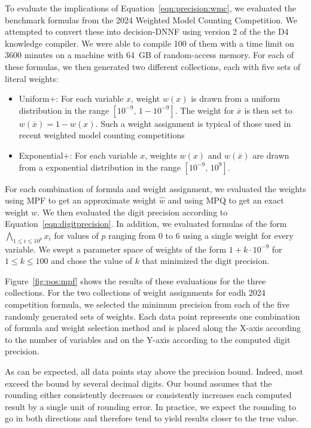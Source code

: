 \documentclass[letterpaper,USenglish,cleveref, autoref, thm-restate]{lipics-v2021}
\newcommand{\obar}[1]{\overline{#1}}
\newcommand{\approximate}[1]{\hat{#1}}
\newcommand{\approxw}{\approximate{w}}
\begin{document}
To evaluate the implications of Equation~\ref{eqn:precision:wmc}, we
evaluated the benchmark formulas from the 2024 Weighted Model Counting
Competition.  We attempted to convert these into decision-DNNF using
version 2 of the the D4 knowledge compiler.  We were able to compile
100 of them with a time limit on 3600 minutes on a machine with 64~GB
of random-access memory.  For each of these formulas, we then generated two different collections, each with five sets of literal weights:
\begin{itemize}
\item \textsf{Uniform$+$}: For each variable $x$, weight $w(x)$
  is drawn from a uniform distribution in the range
  $[10^{-9},\,1-10^{-9}]$. The weight for $\obar{x}$ is then set to
  $w(\obar{x}) = 1-w(x)$.  Such a weight assignment is typical of those used in recent weighted model counting competitions
\item \textsf{Exponential$+$}: For each variable $x$, weights $w(x)$ and $w(\obar{x})$
  are drawn from a exponential distribution in the range
  $[10^{-9},\,10^{9}]$.
\end{itemize}
For each combination of formula and weight assignment, we evaluated
the weights using MPF to get an approximate weight $\approxw$ and
using MPQ to get an exact weight $w$.  We then evaluated the digit precision according to Equation~\ref{eqn:digitprecision}.
In addition, we evaluated formulas of the form $\bigwedge_{1\leq i \leq 10^p} x_i$ for values of $p$ ranging from $0$ to $6$ using a single weight for every variable.
We swept a parameter space of weights of the form $1 + k\cdot 10^{-9}$ for $1 \leq k \leq 100$ and chose the value of $k$ that minimized the digit precision.

Figure~\ref{fig:pos:mpf} shows the results of these evaluations for
the three collections.  For the two collections of weight assignments for eadh 2024 competition formula,
we selected the minimum precision from each of the five randomly
generated sets of weights.  Each data point
represents one combination of formula and weight selection method and is placed
along the X-axis according to the number of variables
and on the Y-axis according to the computed digit precision.

As can
be expected, all data points stay above the precision bound.  Indeed,
most exceed the bound by several decimal digits.  Our bound assumes
that the rounding either consistently decreases or consistently
increases each computed result by a single unit of rounding error.  In
practice, we expect the rounding to go in both directions and
therefore tend to yield results closer to the true value.
\end{document}
